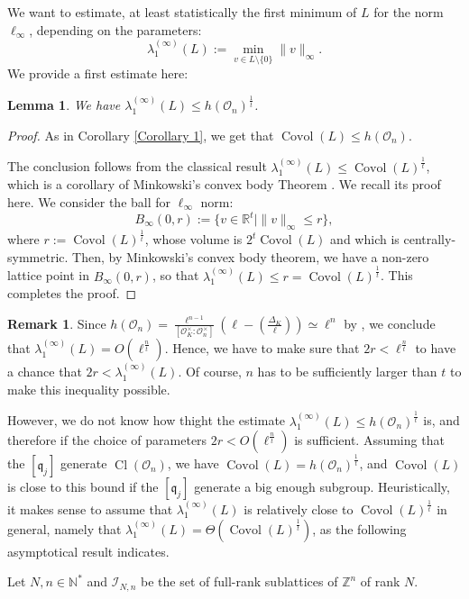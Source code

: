 \documentclass[a4paper,10pt,notitlepage]{report}
\theoremstyle{definition}
\theoremstyle{plain}
\newtheorem{Lemma}[Definition]{Lemma}
\theoremstyle{definition}
\newtheorem{Remark}[Definition]{Remark}
\newcommand{\N}{\mathbb{N}}
\newcommand{\Z}{\mathbb{Z}}
\newcommand{\R}{\mathbb{R}}
\newcommand{\m}[1]{\mathcal{#1}}
\newcommand{\mO}{\mathcal{O}}
\renewcommand{\(}{\left(}
\renewcommand{\)}{\right)}
\newcommand{\mf}[1]{\mathfrak{#1}}
\DeclareMathOperator{\Cl}{Cl}
\DeclareMathOperator{\Covol}{Covol}
\begin{document}
We want to estimate, at least statistically the first minimum of $L$ for the norm $\ell_\infty$, depending on the parameters:
\[\lambda_1^{(\infty)}(L):=\min_{v\in L\setminus\{0\}}\|v\|_\infty.\]
We provide a first estimate here:

\begin{Lemma}
We have $\lambda_1^{(\infty)}(L)\leq h(\mO_n)^{\frac{1}{t}}$.
\end{Lemma}

\begin{proof}
As in Corollary \ref{Corollary 1}, we get that $\Covol(L)\leq h(\mO_n)$.

The conclusion follows from the classical result $\lambda_1^{(\infty)}(L)\leq \Covol(L)^{\frac{1}{t}}$, which is a corollary of Minkowski's convex body Theorem \cite[Theorem V.3]{Lang_ANT}. We recall its proof here. We consider the ball for $\ell_\infty$ norm:
\[B_\infty(0,r):=\{v\in\R^t\mid \|v\|_\infty\leq r\},\]
where $r:=\Covol(L)^{\frac{1}{t}}$, whose volume is $2^t\Covol(L)$ and which is centrally-symmetric. Then, by Minkowski's convex body theorem, we have a non-zero lattice point in $B_\infty(0,r)$, so that $\lambda_1^{(\infty)}(L)\leq r=\Covol(L)^{\frac{1}{t}}$. This completes the proof.
\end{proof}

\begin{Remark}
Since $h(\mO_n)=\frac{\ell^{n-1}}{[\mO_K^\times:\mO_n^\times]}\(\ell-\(\frac{\Delta_K}{\ell}\)\)\simeq\ell^n$ by \cite[Theorem 7.24]{Cox}, we conclude that $\lambda_1^{(\infty)}(L)=O(\ell^{\frac{n}{t}})$. Hence, we have to make sure that $2r<\ell^{\frac{n}{t}}$ to have a chance that $2r<\lambda_1^{(\infty)}(L)$.  Of course, $n$ has to be sufficiently larger than $t$ to make this inequality possible.

However, we do not know how thight the estimate $\lambda_1^{(\infty)}(L)\leq h(\mO_n)^{\frac{1}{t}}$ is, and therefore if the choice of parameters $2r<O(\ell^{\frac{n}{t}})$ is sufficient. Assuming that the $[\mf{q}_j]$ generate $\Cl(\mO_n)$, we have $\Covol(L)=h(\mO_n)^{\frac{1}{t}}$, and $\Covol(L)$ is close to this bound if the $[\mf{q}_j]$ generate a big enough subgroup. Heuristically, it makes sense to assume that $\lambda_1^{(\infty)}(L)$ is relatively close to $\Covol(L)^{\frac{1}{t}}$ in general, namely that $\lambda_1^{(\infty)}(L)=\Theta(\Covol(L)^{\frac{1}{t}})$, as the following asymptotical result indicates. 
\end{Remark}

Let $N, n\in\N^*$ and $\m{I}_{N,n}$ be the set of full-rank sublattices of $\Z^n$ of rank $N$.
\end{document}
